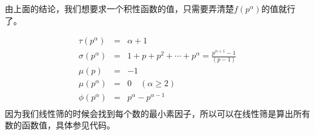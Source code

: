 \documentclass{article}
\begin{document}
		由上面的结论，我们想要求一个积性函数的值，只需要弄清楚$f(p^\alpha)$的值就行了。
		
		$$
			\begin{array}{ccl}
				\tau(p^\alpha) &=&\alpha + 1	\\
				\sigma(p^\alpha)  &=& 1 + p + p^2 + \cdots + p^\alpha = \frac{p^{\alpha+1}-1}{(p-1)}	\\
				\mu(p) &=& -1	\\
				\mu(p^\alpha) &=& 0 \quad ( \alpha \geq 2 )\\
				\phi(p^\alpha) &=& p^\alpha - p^{\alpha - 1}\\
			\end{array}
		$$
		因为我们线性筛的时候会找到每个数的最小素因子，所以可以在线性筛是算出所有数的函数值，具体参见代码。
		
	
\end{document}
